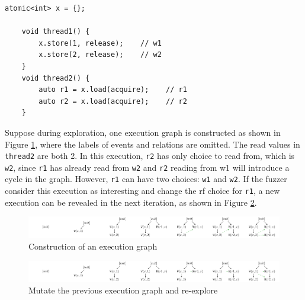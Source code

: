 \begin{lstlisting}[caption={Fuzzing example}, label={exp-fuzz}]
    atomic<int> x = {};
    
    void thread1() {
        x.store(1, release);    // w1
        x.store(2, release);    // w2
    }
    void thread2() {
        auto r1 = x.load(acquire);    // r1
        auto r2 = x.load(acquire);    // r2
    }
    \end{lstlisting}



Suppose during exploration, one execution graph is constructed as shown in Figure \ref{example_construct}, where the labels of events and relations are omitted. The read values in \texttt{thread2} are both 2. In this execution, \texttt{r2} has only choice to read from, which is \texttt{w2}, since \texttt{r1} has already read from \texttt{w2} and \texttt{r2} reading from w1 will introduce a cycle in the graph. However, \texttt{r1} can have two choices: \texttt{w1} and \texttt{w2}. If the fuzzer consider this execution as interesting and change the rf choice for \texttt{r1}, a new execution can be revealed in the next iteration, as shown in Figure \ref{example_mutate}. 

\begin{figure}[htbp] 
    \centering
    \includegraphics[scale=0.52]{figure/exec-graph/example_construct.pdf} 
    \caption{Construction of an execution graph} 
    \label{example_construct} 
\end{figure}

\begin{figure}[htbp] 
    \centering
    \includegraphics[scale=0.52]{figure/exec-graph//example_mutate.pdf} 
    \caption{Mutate the previous execution graph and re-explore} 
    \label{example_mutate} 
\end{figure}


